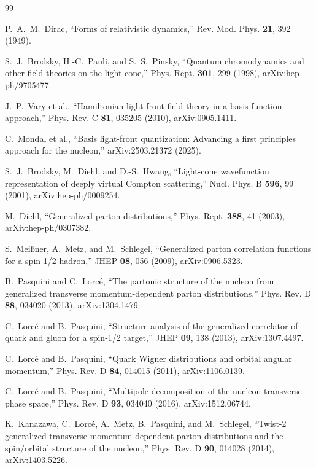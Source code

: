\documentclass[11pt]{article}
\begin{document}
\small
\begin{thebibliography}{99}
\raggedright

P.~A.~M.~Dirac,
``Forms of relativistic dynamics,''
Rev. Mod. Phys. \textbf{21}, 392 (1949).

S.~J.~Brodsky, H.-C.~Pauli, and S.~S.~Pinsky,
``Quantum chromodynamics and other field theories on the light cone,''
Phys. Rept. \textbf{301}, 299 (1998),
arXiv:hep-ph/9705477.

J.~P.~Vary et al.,
``Hamiltonian light-front field theory in a basis function approach,''
Phys. Rev. C \textbf{81}, 035205 (2010),
arXiv:0905.1411.

C.~Mondal et al.,
``Basis light-front quantization: Advancing a first principles approach for
the nucleon,''
arXiv:2503.21372 (2025).

S.~J.~Brodsky, M.~Diehl, and D.-S.~Hwang,
``Light-cone wavefunction representation of deeply virtual Compton
scattering,''
Nucl. Phys. B \textbf{596}, 99 (2001),
arXiv:hep-ph/0009254.

M.~Diehl,
``Generalized parton distributions,''
Phys. Rept. \textbf{388}, 41 (2003),
arXiv:hep-ph/0307382.

S.~Mei{\ss}ner, A.~Metz, and M.~Schlegel,
``Generalized parton correlation functions for a spin-1/2 hadron,''
JHEP \textbf{08}, 056 (2009),
arXiv:0906.5323.

B.~Pasquini and C.~Lorc\'e,
``The partonic structure of the nucleon from generalized transverse
momentum-dependent parton distributions,''
Phys. Rev. D \textbf{88}, 034020 (2013),
arXiv:1304.1479.

C.~Lorc\'e and B.~Pasquini,
``Structure analysis of the generalized correlator of quark and gluon for a
spin-1/2 target,''
JHEP \textbf{09}, 138 (2013),
arXiv:1307.4497.

C.~Lorc\'e and B.~Pasquini,
``Quark Wigner distributions and orbital angular momentum,''
Phys. Rev. D \textbf{84}, 014015 (2011),
arXiv:1106.0139.

C.~Lorc\'e and B.~Pasquini,
``Multipole decomposition of the nucleon transverse phase space,''
Phys. Rev. D \textbf{93}, 034040 (2016),
arXiv:1512.06744.

K.~Kanazawa, C.~Lorc\'e, A.~Metz, B.~Pasquini, and M.~Schlegel,
``Twist-2 generalized transverse-momentum dependent parton distributions and
the spin/orbital structure of the nucleon,''
Phys. Rev. D \textbf{90}, 014028 (2014),
arXiv:1403.5226.


\end{thebibliography}
\end{document}
